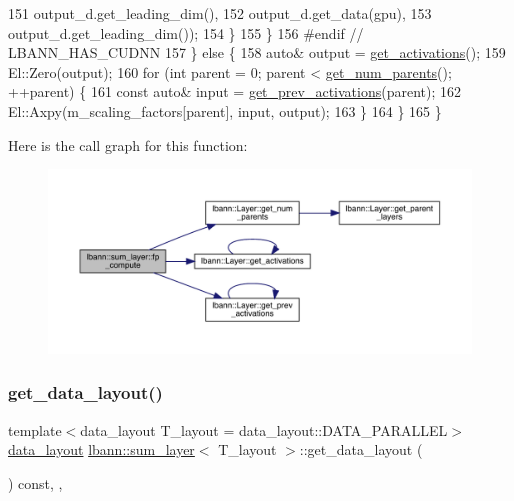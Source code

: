 \begin{DoxyCode}
151                        output\_d.get\_leading\_dim(),
152                        output\_d.get\_data(gpu),
153                        output\_d.get\_leading\_dim());
154         \}
155       \}
156 \textcolor{preprocessor}{  #endif // LBANN\_HAS\_CUDNN}
157     \} \textcolor{keywordflow}{else} \{
158       \textcolor{keyword}{auto}& output = \hyperlink{classlbann_1_1Layer_a1134b1a4385af199d7272c5aa827fa99}{get\_activations}();
159       El::Zero(output);
160       \textcolor{keywordflow}{for} (\textcolor{keywordtype}{int} parent = 0; parent < \hyperlink{classlbann_1_1Layer_ac9290d4a6453ccda5f6b4d8b57b49ba3}{get\_num\_parents}(); ++parent) \{
161         \textcolor{keyword}{const} \textcolor{keyword}{auto}& input = \hyperlink{classlbann_1_1Layer_a45853df73a2e72bfaa774665a0f37ed7}{get\_prev\_activations}(parent);
162         El::Axpy(m\_scaling\_factors[parent], input, output);
163       \}
164     \}
165   \}
\end{DoxyCode}
Here is the call graph for this function\+:\nopagebreak
\begin{figure}[H]
\begin{center}
\leavevmode
\includegraphics[width=350pt]{classlbann_1_1sum__layer_a8d235d61507e76f42ee83a74d1098977_cgraph}
\end{center}
\end{figure}
\mbox{\label{classlbann_1_1sum__layer_a6c71a7d29f6e36b2a1f588a2545c769e}} 
\subsubsection{\texorpdfstring{get\+\_\+data\+\_\+layout()}{get\_data\_layout()}}
{\footnotesize\ttfamily template$<$data\+\_\+layout T\+\_\+layout = data\+\_\+layout\+::\+D\+A\+T\+A\+\_\+\+P\+A\+R\+A\+L\+L\+EL$>$ \\
\hyperlink{base_8hpp_a786677cbfb3f5677b4d84f3056eb08db}{data\+\_\+layout} \hyperlink{classlbann_1_1sum__layer}{lbann\+::sum\+\_\+layer}$<$ T\+\_\+layout $>$\+::get\+\_\+data\+\_\+layout (\begin{DoxyParamCaption}{ }\end{DoxyParamCaption}) const\hspace{0.3cm}{\ttfamily [inline]}, {\ttfamily [override]}, {\ttfamily [virtual]}}

